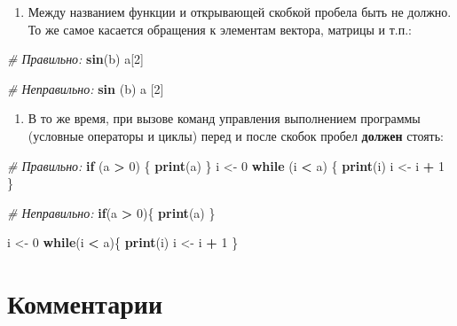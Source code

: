 \documentclass[]{book}
\newenvironment{Shaded}{\begin{snugshade}}{\end{snugshade}}
\newcommand{\KeywordTok}[1]{\textcolor[rgb]{0.13,0.29,0.53}{\textbf{#1}}}
\newcommand{\DecValTok}[1]{\textcolor[rgb]{0.00,0.00,0.81}{#1}}
\newcommand{\StringTok}[1]{\textcolor[rgb]{0.31,0.60,0.02}{#1}}
\newcommand{\CommentTok}[1]{\textcolor[rgb]{0.56,0.35,0.01}{\textit{#1}}}
\newcommand{\ControlFlowTok}[1]{\textcolor[rgb]{0.13,0.29,0.53}{\textbf{#1}}}
\newcommand{\OperatorTok}[1]{\textcolor[rgb]{0.81,0.36,0.00}{\textbf{#1}}}
\newcommand{\NormalTok}[1]{#1}
\providecommand{\tightlist}{%
  \setlength{\itemsep}{0pt}\setlength{\parskip}{0pt}}
\begin{document}
\begin{enumerate}
\def\labelenumi{\arabic{enumi}.}
\setcounter{enumi}{3}
\tightlist
\item
  Между названием функции и открывающей скобкой пробела быть не должно.
  То же самое касается обращения к элементам вектора, матрицы и т.п.:
\end{enumerate}

\begin{Shaded}
\begin{Highlighting}[]
\CommentTok{# Правильно:}
\KeywordTok{sin}\NormalTok{(b)}
\NormalTok{a[}\DecValTok{2}\NormalTok{]}

\CommentTok{# Неправильно:}
\KeywordTok{sin}\NormalTok{ (b)}
\NormalTok{a [}\DecValTok{2}\NormalTok{]}
\end{Highlighting}
\end{Shaded}

\begin{enumerate}
\def\labelenumi{\arabic{enumi}.}
\setcounter{enumi}{4}
\tightlist
\item
  В то же время, при вызове команд управления выполнением программы
  (условные операторы и циклы) перед и после скобок пробел
  \textbf{должен} стоять:
\end{enumerate}

\begin{Shaded}
\begin{Highlighting}[]
\CommentTok{# Правильно:}
\ControlFlowTok{if}\NormalTok{ (a }\OperatorTok{>}\StringTok{ }\DecValTok{0}\NormalTok{) \{}
  \KeywordTok{print}\NormalTok{(a)}
\NormalTok{\}}
\NormalTok{i <-}\StringTok{ }\DecValTok{0}
\ControlFlowTok{while}\NormalTok{ (i }\OperatorTok{<}\StringTok{ }\NormalTok{a) \{}
  \KeywordTok{print}\NormalTok{(i)}
\NormalTok{  i <-}\StringTok{ }\NormalTok{i }\OperatorTok{+}\StringTok{ }\DecValTok{1}
\NormalTok{\}}

\CommentTok{# Неправильно:}
\ControlFlowTok{if}\NormalTok{(a }\OperatorTok{>}\StringTok{ }\DecValTok{0}\NormalTok{)\{}
  \KeywordTok{print}\NormalTok{(a)}
\NormalTok{\}}

\NormalTok{i <-}\StringTok{ }\DecValTok{0}
\ControlFlowTok{while}\NormalTok{(i }\OperatorTok{<}\StringTok{ }\NormalTok{a)\{}
  \KeywordTok{print}\NormalTok{(i)}
\NormalTok{  i <-}\StringTok{ }\NormalTok{i }\OperatorTok{+}\StringTok{ }\DecValTok{1}
\NormalTok{\}}
\end{Highlighting}
\end{Shaded}

\section*{Комментарии}
\end{document}
